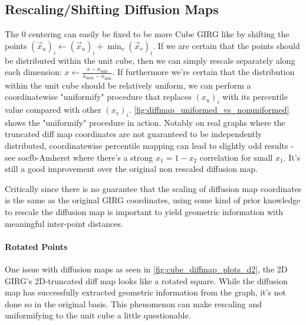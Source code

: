 \subsection{Rescaling/Shifting Diffusion Maps}
The 0 centering can easily be fixed to be more Cube GIRG like by shifting the points $(\vec{x}_u)_i \gets (\vec{x}_u)_i + \min_v (\vec{x}_v)_i$.
If we are certain that the points should be distributed within the unit cube, then we can simply rescale separately along each dimension: $x \gets \frac{x - x_{\min}}{x_{\max} - x_{\min}}$.
If furthermore we're certain that the distribution within the unit cube should be relatively uniform, we can perform a coordinatewise "uniformify" procedure that replaces $(x_u)_i$ with its percentile value compared with other $(x_v)_i$. \cref{fig:diffmap_uniformed_vs_nonuniformed} shows the "uniformify" procedure in action. Notably on real graphs where the truncated diff map coordinates are not guaranteed to be independently distributed, coordinatewise percentile mapping can lead to slightly odd results - see socfb-Amherst where there's a strong $x_1 = 1 - x_2$ correlation for small $x_1$. It's still a good improvement over the original non rescaled diffusion map.


Critically since there is no guarantee that the scaling of diffusion map coordinates is the same as the original GIRG coordinates, using some kind of prior knowledge to rescale the diffusion map is important to yield geometric information with meaningful inter-point distances.

\paragraph{Rotated Points} One issue with diffusion maps as seen in \cref{fig:cube_diffmap_plots_d2}, the 2D GIRG's 2D-truncated diff map looks like a rotated square. While the diffusion map has successfully extracted geometric information from the graph, it's not done so in the original basis. This phenomenon can make rescaling and uniformifying to the unit cube a little questionable.

